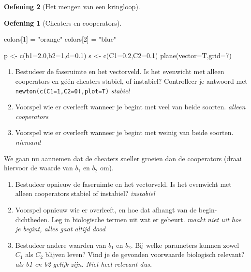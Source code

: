 \documentclass[
  a4paper,
]{scrbook}
\newenvironment{Shaded}{\begin{snugshade}}{\end{snugshade}}
\newcommand{\AttributeTok}[1]{\textcolor[rgb]{0.40,0.45,0.13}{#1}}
\newcommand{\DecValTok}[1]{\textcolor[rgb]{0.68,0.00,0.00}{#1}}
\newcommand{\FloatTok}[1]{\textcolor[rgb]{0.68,0.00,0.00}{#1}}
\newcommand{\FunctionTok}[1]{\textcolor[rgb]{0.28,0.35,0.67}{#1}}
\newcommand{\NormalTok}[1]{\textcolor[rgb]{0.00,0.23,0.31}{#1}}
\newcommand{\OtherTok}[1]{\textcolor[rgb]{0.00,0.23,0.31}{#1}}
\newcommand{\StringTok}[1]{\textcolor[rgb]{0.13,0.47,0.30}{#1}}
\providecommand{\tightlist}{%
  \setlength{\itemsep}{0pt}\setlength{\parskip}{0pt}}\usepackage{longtable,booktabs,array}
\theoremstyle{definition}
\newtheorem{exercise}{Oefening}[chapter]
\theoremstyle{remark}
\begin{document}
\begin{exercise}[Het mengen van een
kringloop]
\begin{exercise}[Cheaters en
cooperators]
\begin{Shaded}
\begin{Highlighting}[]
\NormalTok{colors[}\DecValTok{1}\NormalTok{] }\OtherTok{=} \StringTok{"orange"}
\NormalTok{colors[}\DecValTok{2}\NormalTok{] }\OtherTok{=} \StringTok{"blue"}

\NormalTok{p }\OtherTok{\textless{}{-}} \FunctionTok{c}\NormalTok{(}\AttributeTok{b1=}\FloatTok{2.0}\NormalTok{,}\AttributeTok{b2=}\DecValTok{1}\NormalTok{,}\AttributeTok{d=}\FloatTok{0.1}\NormalTok{)}
\NormalTok{s }\OtherTok{\textless{}{-}} \FunctionTok{c}\NormalTok{(}\AttributeTok{C1=}\FloatTok{0.2}\NormalTok{,}\AttributeTok{C2=}\FloatTok{0.1}\NormalTok{)}
\FunctionTok{plane}\NormalTok{(}\AttributeTok{vector=}\NormalTok{T,}\AttributeTok{grid=}\DecValTok{7}\NormalTok{)}
\end{Highlighting}
\end{Shaded}

\begin{enumerate}
\def\labelenumi{\alph{enumi}.}
\setcounter{enumi}{3}
\tightlist
\item
  Bestudeer de faseruimte en het vectorveld. Is het evenwicht met alleen
  cooperators en géén cheaters stabiel, of instabiel? Controlleer je
  antwoord met \texttt{newton(c(C1=1,C2=0),plot=T)} \emph{stabiel}
\item
  Voorspel wie er overleeft wanneer je begint met veel van beide
  soorten. \emph{alleen cooperators}
\item
  Voorspel wie er overleeft wanneer je begint met weinig van beide
  soorten. \emph{niemand}
\end{enumerate}

We gaan nu aannemen dat de cheaters sneller groeien dan de cooperators
(draai hiervoor de waarde van \(b_1\) en \(b_2\) om).

\begin{enumerate}
\def\labelenumi{\alph{enumi}.}
\setcounter{enumi}{6}
\tightlist
\item
  Bestudeer opnieuw de faseruimte en het vectorveld. Is het evenwicht
  met alleen cooperators stabiel of instabiel? \emph{instabiel}
\item
  Voorspel opnieuw wie er overleeft, en hoe dat afhangt van de
  begin-dichtheden. Leg in biologische termen uit wat er gebeurt.
  \emph{maakt niet uit hoe je begint, alles gaat altijd dood}
\item
  Bestudeer andere waarden van \(b_1\) en \(b_2\). Bij welke parameters
  kunnen zowel \(C_1\) als \(C_2\) blijven leven? Vind je de gevonden
  voorwaarde biologisch relevant? \emph{als b1 en b2 gelijk zijn. Niet
  heel relevant dus.}
\end{enumerate}


\end{exercise}
\end{exercise}
\end{document}
